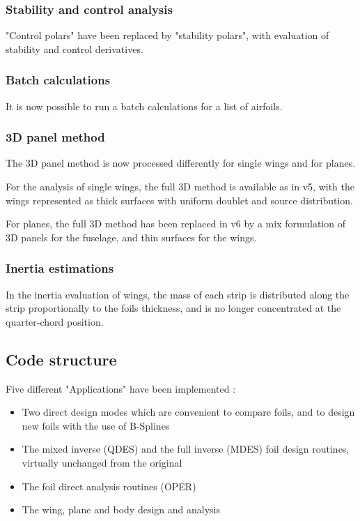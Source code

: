 \documentclass[a4paper,twoside,12pt,dvips]{article}
\begin{document}
\subsubsection{Stability and control analysis}

"Control polars" have been replaced by "stability polars", with
evaluation of stability and control derivatives.

\subsubsection{Batch calculations}

It is now possible to run a batch calculations for a list of airfoils.

\subsubsection{3D panel method}

The 3D panel method is now processed differently for single wings and
for planes.

For the analysis of single wings, the full 3D method is available as
in v5, with the wings represented as thick surfaces with uniform
doublet and source distribution.

For planes, the full 3D method has been replaced in v6 by a mix
formulation of 3D panels for the fuselage, and thin surfaces for the
wings.

\subsubsection{Inertia estimations}

In the inertia evaluation of wings, the mass of each strip is
distributed along the strip proportionally to the foils thickness, and
is no longer concentrated at the quarter-chord position.

\subsection{Code structure}

Five different "Applications" have been implemented :
\begin{itemize}
\item Two direct design modes which are convenient to compare foils,
and to design new foils with the use of B-Splines
\item The mixed inverse (QDES) and the full inverse (MDES) foil design
routines, virtually unchanged from the original
\item The foil direct analysis routines (OPER)
\item The wing, plane and body design and analysis
\end{itemize}
\end{document}
